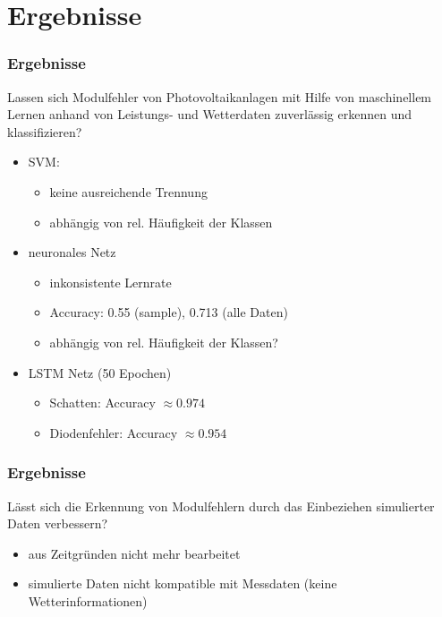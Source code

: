 \documentclass[utf8x, xcolor=dvipsnames]{beamer}
\begin{document}
\section{Ergebnisse}

\begin{frame}
\frametitle{Ergebnisse}
Lassen sich Modulfehler von Photovoltaikanlagen mit Hilfe von maschinellem Lernen anhand von Leistungs- und Wetterdaten zuverlässig erkennen und klassifizieren?\newline
\begin{itemize}
	\item SVM:
	\begin{itemize}
		\item keine ausreichende Trennung
		\item abhängig von rel. Häufigkeit der Klassen
	\end{itemize}
	\item neuronales Netz
	\begin{itemize}
		\item inkonsistente Lernrate
		\item Accuracy: 0.55 (sample), 0.713 (alle Daten)
		\item abhängig von rel. Häufigkeit der Klassen?
	\end{itemize}
	\item LSTM Netz (50 Epochen)
	\begin{itemize}
		\item Schatten: Accuracy $\approx 0.974$
		\item Diodenfehler: Accuracy $\approx 0.954$
	\end{itemize}
\end{itemize}
\end{frame}

\begin{frame}
\frametitle{Ergebnisse}
Lässt sich die Erkennung von Modulfehlern durch das Einbeziehen simulierter Daten verbessern?\newline
\begin{itemize}
	\item aus Zeitgründen nicht mehr bearbeitet
	\item simulierte Daten nicht kompatible mit Messdaten (keine Wetterinformationen)
\end{itemize}
\end{frame}

\end{document}
